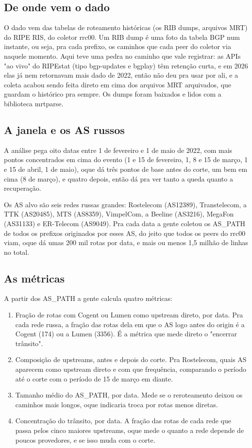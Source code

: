 \documentclass[12pt]{article}
\begin{document}
\subsection{De onde vem o dado}

O dado vem das tabelas de roteamento históricas (os RIB dumps, arquivos MRT) do RIPE RIS, do coletor rrc00. Um RIB dump é uma foto da tabela BGP num instante, ou seja, pra cada prefixo, os caminhos que cada peer do coletor via naquele momento. Aqui teve uma pedra no caminho que vale registrar: as APIs "ao vivo" do RIPEstat (tipo bgp-updates e bgplay) têm retenção curta, e em 2026 elas já nem retornavam mais dado de 2022, então não deu pra usar por ali, e a coleta acabou sendo feita direto em cima dos arquivos MRT arquivados, que guardam o histórico pra sempre. Os dumps foram baixados e lidos com a biblioteca mrtparse.

\subsection{A janela e os AS russos}

A análise pega oito datas entre 1 de fevereiro e 1 de maio de 2022, com mais pontos concentrados em cima do evento (1 e 15 de fevereiro, 1, 8 e 15 de março, 1 e 15 de abril, 1 de maio), oque dá três pontos de base antes do corte, um bem em cima (8 de março), e quatro depois, então dá pra ver tanto a queda quanto a recuperação.

Os AS alvo são seis redes russas grandes: Rostelecom (AS12389), Transtelecom, a TTK (AS20485), MTS (AS8359), VimpelCom, a Beeline (AS3216), MegaFon (AS31133) e ER-Telecom (AS9049). Pra cada data a gente coletou os AS\_PATH de todos os prefixos originados por esses AS, do jeito que todos os peers do rrc00 viam, oque dá umas 200 mil rotas por data, e mais ou menos 1,5 milhão de linhas no total.

\subsection{As métricas}

A partir dos AS\_PATH a gente calcula quatro métricas:

\begin{enumerate}
  \item Fração de rotas com Cogent ou Lumen como upstream direto, por data. Pra cada rede russa, a fração das rotas dela em que o AS logo antes do origin é a Cogent (174) ou a Lumen (3356). É a métrica que mede direto o "encerrar trânsito".
  \item Composição de upstreams, antes e depois do corte. Pra Rostelecom, quais AS aparecem como upstream direto e com que frequência, comparando o período até o corte com o período de 15 de março em diante.
  \item Tamanho médio do AS\_PATH, por data. Mede se o reroteamento deixou os caminhos mais longos, oque indicaria troca por rotas menos diretas.
  \item Concentração do trânsito, por data. A fração das rotas de cada rede que passa pelos cinco maiores upstreams, oque mede o quanto a rede depende de poucos provedores, e se isso muda com o corte.
\end{enumerate}
\end{document}
